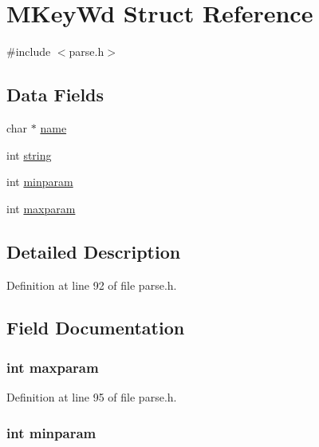 \hypertarget{struct_m_key_wd}{\section{M\-Key\-Wd Struct Reference}
\label{struct_m_key_wd}
}


{\ttfamily \#include $<$parse.\-h$>$}

\subsection*{Data Fields}
\begin{DoxyCompactItemize}
\item 
char $\ast$ \hyperlink{struct_m_key_wd_a5ac083a645d964373f022d03df4849c8}{name}
\item 
int \hyperlink{struct_m_key_wd_a6173b7d8f1e6927813745d72ea5bed19}{string}
\item 
int \hyperlink{struct_m_key_wd_a79b322efc3a199fce5d2d00de1fbf6d3}{minparam}
\item 
int \hyperlink{struct_m_key_wd_a1cde0b1b561c60f7362cf6225ef2857b}{maxparam}
\end{DoxyCompactItemize}


\subsection{Detailed Description}


Definition at line 92 of file parse.\-h.



\subsection{Field Documentation}
\hypertarget{struct_m_key_wd_a1cde0b1b561c60f7362cf6225ef2857b}{
\subsubsection[{maxparam}]{\setlength{\rightskip}{0pt plus 5cm}int maxparam}}\label{struct_m_key_wd_a1cde0b1b561c60f7362cf6225ef2857b}


Definition at line 95 of file parse.\-h.

\hypertarget{struct_m_key_wd_a79b322efc3a199fce5d2d00de1fbf6d3}{
\subsubsection[{minparam}]{\setlength{\rightskip}{0pt plus 5cm}int minparam}}\label{struct_m_key_wd_a79b322efc3a199fce5d2d00de1fbf6d3}


